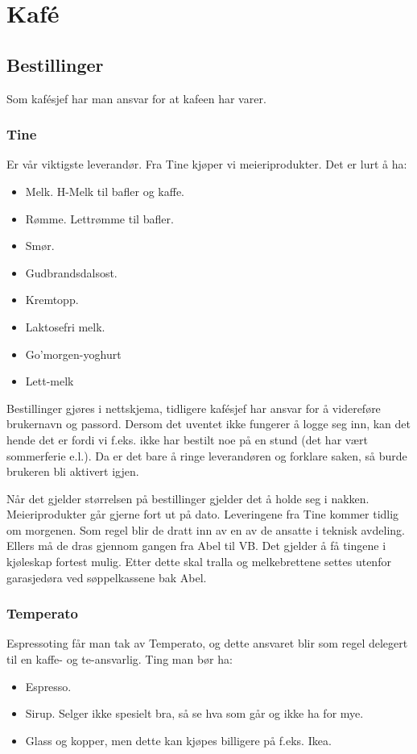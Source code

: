 \section{Kaf\'e}

\subsection{Bestillinger}
Som kaf\'esjef har man ansvar for at kafeen har varer.
\subsubsection{Tine}
Er vår viktigste leverandør. Fra Tine kjøper vi meieriprodukter.
Det er lurt å ha:
\begin{itemize}
       \item Melk. H-Melk til bafler og kaffe.
       \item Rømme. Lettrømme til bafler.
       \item Smør.
       \item Gudbrandsdalsost.
       \item Kremtopp.
       \item Laktosefri melk.
       \item Go'morgen-yoghurt
       \item Lett-melk
\end{itemize}

Bestillinger gjøres i nettskjema, tidligere kafésjef har ansvar for å videreføre
brukernavn og passord. Dersom det uventet ikke fungerer å logge seg inn, kan det
hende det er fordi vi f.eks. ikke har bestilt noe på en stund (det har vært
sommerferie e.l.). Da er det bare å ringe leverandøren og forklare saken, så
burde brukeren bli aktivert igjen.

Når det gjelder størrelsen på bestillinger gjelder det å holde seg i nakken.
Meieriprodukter går gjerne fort ut på dato. Leveringene fra Tine kommer tidlig
om morgenen. Som regel blir de dratt inn av en av de ansatte i teknisk avdeling.
Ellers må de dras gjennom gangen fra Abel til VB. Det gjelder å få tingene i
kjøleskap fortest mulig. Etter dette skal tralla og melkebrettene settes utenfor
garasjedøra ved søppelkassene bak Abel.

\subsubsection{Temperato}
Espressoting får man tak av Temperato, og dette ansvaret blir som regel delegert
til en kaffe- og te-ansvarlig. Ting man bør ha:
\begin{itemize}
       \item Espresso.
       \item Sirup. Selger ikke spesielt bra, så se hva som går og ikke ha for mye.
       \item Glass og kopper, men dette kan kjøpes billigere på f.eks. Ikea.
\end{itemize}

